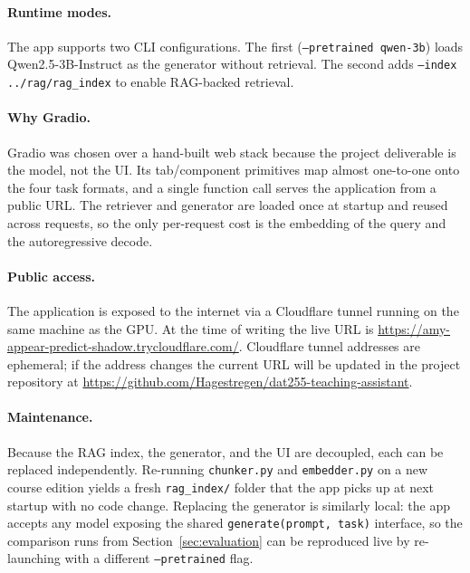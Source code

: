 \paragraph{Runtime modes.}
The app supports two CLI configurations. The first (\texttt{--pretrained qwen-3b}) loads
Qwen2.5-3B-Instruct as the generator without retrieval. The second adds
\texttt{--index ../rag/rag\_index} to enable RAG-backed retrieval.

\paragraph{Why Gradio.}
Gradio was chosen over a hand-built web stack because the project deliverable is the model,
not the UI. Its tab/component primitives map almost one-to-one onto the four task formats,
and a single function call serves the application from a public URL. The
retriever and generator are loaded once at startup and reused across requests, so the only
per-request cost is the embedding of the query and the autoregressive decode.

\paragraph{Public access.}
The application is exposed to the internet via a Cloudflare tunnel running on the same
machine as the GPU. At the time of writing the live URL is
\url{https://amy-appear-predict-shadow.trycloudflare.com/}.
Cloudflare tunnel addresses are ephemeral; if the address changes the current URL will be
updated in the project repository at
\url{https://github.com/Hagestregen/dat255-teaching-assistant}.

\paragraph{Maintenance.}
Because the RAG index, the generator, and the UI are decoupled, each can be replaced
independently. Re-running \texttt{chunker.py} and \texttt{embedder.py} on a new course edition
yields a fresh \texttt{rag\_index/} folder that the app picks up at next startup with no code
change. Replacing the generator is similarly local: the app accepts any model exposing the
shared \texttt{generate(prompt, task)} interface, so the comparison runs from
Section~\ref{sec:evaluation} can be reproduced live by re-launching with a different
\texttt{--pretrained} flag.
